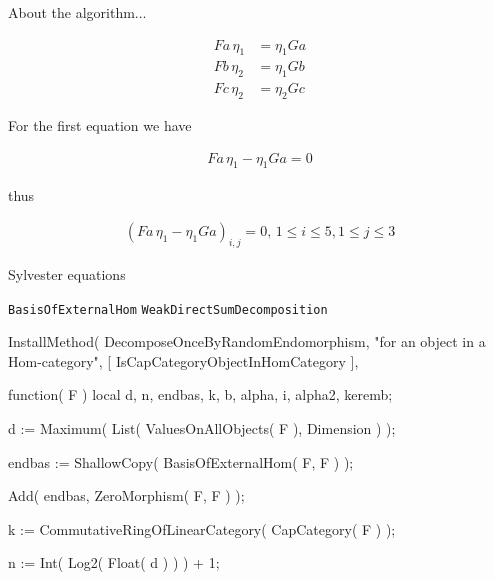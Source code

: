 
About the algorithm...








\begin{align}
Fa\,\eta_{1} &= \eta_{1} Ga \\
Fb\,\eta_{2} &= \eta_{1} Gb \\
Fc\,\eta_{2} &= \eta_{2} Gc
\end{align}

For the first equation we have

\begin{align}
Fa\,\eta_{1} - \eta_{1} Ga = 0
\end{align}

thus

\begin{align}
\left( Fa\,\eta_{1} - \eta_{1} Ga \right)_{i,j} = 0,\, 1\leq i \leq 5, 1\leq j \leq 3
\end{align}

Sylvester equations

\texttt{BasisOfExternalHom}
\texttt{WeakDirectSumDecomposition}

InstallMethod( DecomposeOnceByRandomEndomorphism,
        "for an object in a Hom-category",
        [ IsCapCategoryObjectInHomCategory ],
        
  function( F )
    local d, n, endbas, k, b, alpha, i, alpha2, keremb;
    
    d := Maximum( List( ValuesOnAllObjects( F ), Dimension ) );
    
    endbas := ShallowCopy( BasisOfExternalHom( F, F ) );
    
    Add( endbas, ZeroMorphism( F, F ) );
    
    k := CommutativeRingOfLinearCategory( CapCategory( F ) );
    
    n := Int( Log2( Float( d ) ) ) + 1;
    
